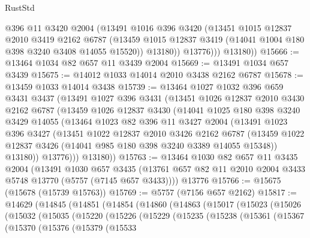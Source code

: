 \begin{lexlean}{RustStd}
\begin{coremodule}
              @396
              @11
              @3420
              @2004
              (@13491
                @1016
                @396
                @3420
                (@13451
                  @1015
                  @12837
                  @2010
                  @3419
                  @2162
                  @6787
                  (@13459 @1015 @12837 @3419 (@14041 @1004 @180 @398 @3240 @3408 @14055 @15520))
                  @13180))
              @13776)))
        @13180))
@15666 := @13464 @1034 @82 @657 @11 @3439 @2004
@15669 := @13491 @1034 @657 @3439
@15675 := @14012 @1033 @14014 @2010 @3438 @2162 @6787
@15678 := @13459 @1033 @14014 @3438
@15739 := @13464
    @1027
    @1032
    @396
    @659
    @3431
    @3437
    (@13491
      @1027
      @396
      @3431
      (@13451
        @1026
        @12837
        @2010
        @3430
        @2162
        @6787
        (@13459
          @1026
          @12837
          @3430
          (@14041
            @1025
            @180
            @398
            @3240
            @3429
            @14055
            (@13464
              @1023
              @82
              @396
              @11
              @3427
              @2004
              (@13491
                @1023
                @396
                @3427
                (@13451
                  @1022
                  @12837
                  @2010
                  @3426
                  @2162
                  @6787
                  (@13459 @1022 @12837 @3426 (@14041 @985 @180 @398 @3240 @3389 @14055 @15348))
                  @13180))
              @13776)))
        @13180))
@15763 := @13464
    @1030
    @82
    @657
    @11
    @3435
    @2004
    (@13491
      @1030
      @657
      @3435
      (@13761 @657 @82 @11 @2010 @2004 @3433 @5748 @13770 (@5757 (@7145 @657 @3433))))
    @13776
@15766 := @15675 (@15678 (@15739 @15763))
@15769 := @5757 (@7156 @657 @2162)
@15817 := @14629
    (@14845
      (@14851
        (@14854
          (@14860
            (@14863
              (@15017
                (@15023
                  (@15026
                    (@15032
                      (@15035
                        (@15220
                          (@15226
                            (@15229
                              (@15235
                                (@15238
                                  (@15361
                                    (@15367
                                      (@15370
                                        (@15376
                                          (@15379
                                            (@15533

\end{coremodule}
\end{lexlean}
